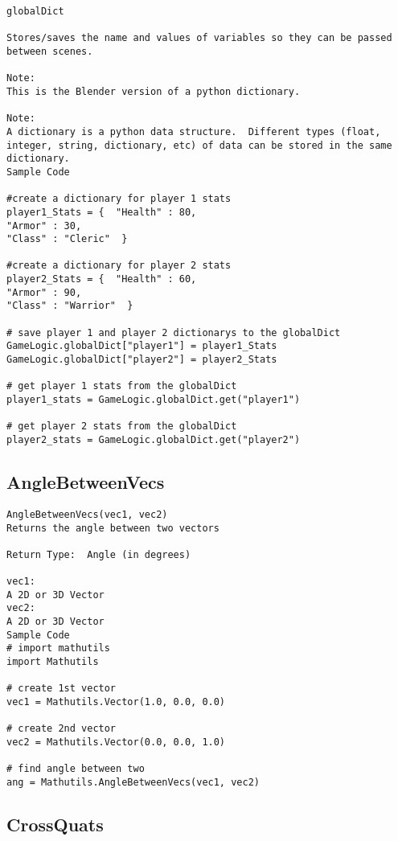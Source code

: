 \begin{verbatim}
globalDict

Stores/saves the name and values of variables so they can be passed between scenes.

Note:
This is the Blender version of a python dictionary.  

Note:
A dictionary is a python data structure.  Different types (float, integer, string, dictionary, etc) of data can be stored in the same dictionary.
Sample Code

#create a dictionary for player 1 stats
player1_Stats = {  "Health" : 80,
"Armor" : 30,
"Class" : "Cleric"  }
                
#create a dictionary for player 2 stats
player2_Stats = {  "Health" : 60,
"Armor" : 90,
"Class" : "Warrior"  }

# save player 1 and player 2 dictionarys to the globalDict
GameLogic.globalDict["player1"] = player1_Stats 
GameLogic.globalDict["player2"] = player2_Stats

# get player 1 stats from the globalDict
player1_stats = GameLogic.globalDict.get("player1")

# get player 2 stats from the globalDict
player2_stats = GameLogic.globalDict.get("player2")
\end{verbatim}





\subsection{AngleBetweenVecs}
\begin{verbatim}
AngleBetweenVecs(vec1, vec2)
Returns the angle between two vectors

Return Type:  Angle (in degrees)

vec1:
A 2D or 3D Vector 
vec2:
A 2D or 3D Vector 
Sample Code
# import mathutils
import Mathutils

# create 1st vector 
vec1 = Mathutils.Vector(1.0, 0.0, 0.0)

# create 2nd vector 
vec2 = Mathutils.Vector(0.0, 0.0, 1.0)

# find angle between two
ang = Mathutils.AngleBetweenVecs(vec1, vec2)
\end{verbatim}

\subsection{CrossQuats}
